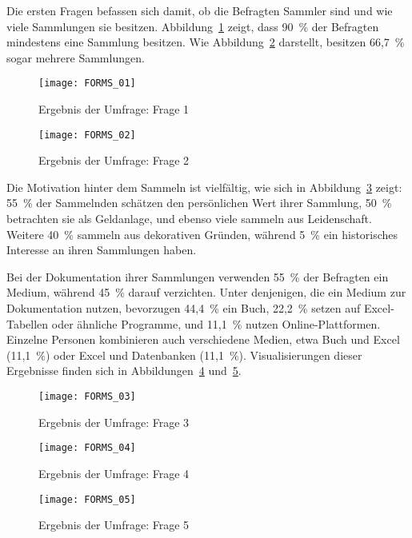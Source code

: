 Die ersten Fragen befassen sich damit, ob die Befragten Sammler sind und wie viele Sammlungen sie besitzen.
Abbildung~\ref{fig:forms_result_01} zeigt, dass 90~\% der Befragten mindestens eine Sammlung besitzen.
Wie Abbildung~\ref{fig:forms_result_02} darstellt, besitzen 66,7~\% sogar mehrere Sammlungen.

\begin{figure}[h]
    \centering
    \texttt{[image: FORMS\_01]}
    \caption{Ergebnis der Umfrage: Frage 1}
    \label{fig:forms_result_01}
\end{figure}

\newpage
\begin{figure}[h]
    \centering
    \texttt{[image: FORMS\_02]}
    \caption{Ergebnis der Umfrage: Frage 2}
    \label{fig:forms_result_02}
\end{figure}

Die Motivation hinter dem Sammeln ist vielfältig, wie sich in Abbildung~\ref{fig:forms_result_03} zeigt: 55~\% der Sammelnden schätzen den persönlichen Wert ihrer Sammlung, 50~\% betrachten sie als Geldanlage, und ebenso viele sammeln aus Leidenschaft.
Weitere 40~\% sammeln aus dekorativen Gründen, während 5~\% ein historisches Interesse an ihren Sammlungen haben.

Bei der Dokumentation ihrer Sammlungen verwenden 55~\% der Befragten ein Medium, während 45~\% darauf verzichten.
Unter denjenigen, die ein Medium zur Dokumentation nutzen, bevorzugen 44,4~\% ein Buch, 22,2~\% setzen auf Excel-Tabellen oder ähnliche Programme, und 11,1~\% nutzen Online-Plattformen.
Einzelne Personen kombinieren auch verschiedene Medien, etwa Buch und Excel (11,1~\%) oder Excel und Datenbanken (11,1~\%).
Visualisierungen dieser Ergebnisse finden sich in Abbildungen~\ref{fig:forms_result_04} und~\ref{fig:forms_result_05}.

\newpage

\begin{figure}[h!]
    \centering
    \texttt{[image: FORMS\_03]}
    \caption{Ergebnis der Umfrage: Frage 3}
    \label{fig:forms_result_03}
\end{figure}

\begin{figure}[h!]
    \centering
    \texttt{[image: FORMS\_04]}
    \caption{Ergebnis der Umfrage: Frage 4}
    \label{fig:forms_result_04}
\end{figure}
\begin{figure}[h!]
    \centering
    \texttt{[image: FORMS\_05]}
    \caption{Ergebnis der Umfrage: Frage 5}
    \label{fig:forms_result_05}
\end{figure}

